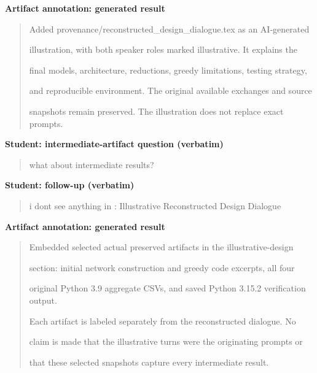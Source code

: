 \par\medskip\noindent\textbf{Artifact annotation: generated result}\par

\begin{quote}\small\raggedright

Added provenance/reconstructed\_design\_dialogue.tex as an AI-generated\par
illustration, with both speaker roles marked illustrative. It explains the\par
final models, architecture, reductions, greedy limitations, testing strategy,\par
and reproducible environment. The original available exchanges and source\par
snapshots remain preserved. The illustration does not replace exact prompts.\par

\end{quote}

\par\medskip\noindent\textbf{Student: intermediate-artifact question (verbatim)}\par

\begin{quote}\small\raggedright

what about intermediate results?\par

\end{quote}

\par\medskip\noindent\textbf{Student: follow-up (verbatim)}\par

\begin{quote}\small\raggedright

i dont see anything in : Illustrative Reconstructed Design Dialogue\par

\end{quote}

\par\medskip\noindent\textbf{Artifact annotation: generated result}\par

\begin{quote}\small\raggedright

Embedded selected actual preserved artifacts in the illustrative-design\par
section: initial network construction and greedy code excerpts, all four\par
original Python 3.9 aggregate CSVs, and saved Python 3.15.2 verification output.\par
Each artifact is labeled separately from the reconstructed dialogue. No\par
claim is made that the illustrative turns were the originating prompts or\par
that these selected snapshots capture every intermediate result.\par

\end{quote}
